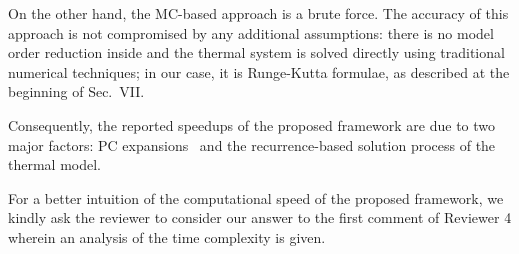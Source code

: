 \begin{authors}
On the other hand, the MC-based approach is a brute force.
The accuracy of this approach is not compromised by any additional assumptions: there is no model order reduction inside and the thermal system is solved directly using traditional numerical techniques; in our case, it is Runge-Kutta formulae, as described at the beginning of Sec.~VII.

Consequently, the reported speedups of the proposed framework are due to two major factors: PC expansions \perse\ and the recurrence-based solution process of the thermal model.

For a better intuition of the computational speed of the proposed framework, we kindly ask the reviewer to consider our answer to the first comment of Reviewer 4 wherein an analysis of the time complexity is given.

\begin{actions}
\end{actions}
\end{authors}
